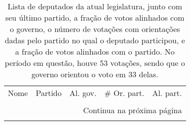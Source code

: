 \begin{longtable}{llrrr}
    \caption{Lista de deputados da atual legislatura, junto com seu último partido, a fração de votos
  alinhados com o governo, o número de votações com orientações dadas pelo partido no qual o deputado participou,
  e a fração de votos alinhados com o partido. No período em questão, houve 53 votações, sendo que o
  governo orientou o voto em 33 delas.}\\

\toprule
                                Nome &        Partido &  Al. gov. &  \# Or. part. &  Al. part. \\
                                     &                &           &              &            \\
\midrule
\endhead
\midrule
\multicolumn{5}{r}{{Continua na próxima página}} \\
\midrule
\endfoot


\end{longtable}
